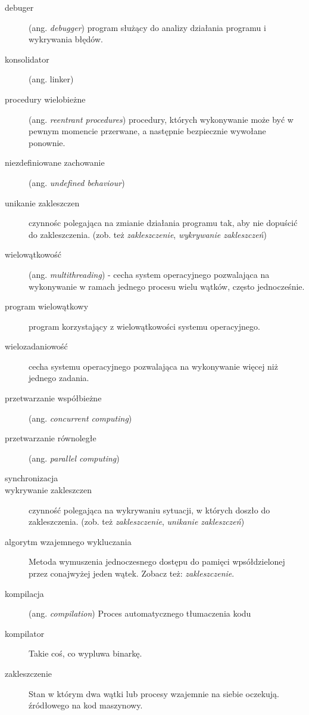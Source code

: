 \documentclass[12pt]{article}
\begin{document}
\begin{description}
	\item[debuger] (ang. \emph{debugger}) program służący do analizy działania programu i wykrywania błędów.
	\item[konsolidator] (ang. linker)
	\item[procedury wielobieżne] (ang. \emph{reentrant procedures}) procedury, których wykonywanie może być w pewnym momencie przerwane, a następnie bezpiecznie wywołane ponownie.
	\item[niezdefiniowane zachowanie] (ang. \emph{undefined behaviour})
	\item[unikanie zakleszczen] czynnośc polegająca na zmianie działania programu tak, aby nie dopuścić do zakleszczenia. (zob. też \emph{zakleszczenie}, \emph{wykrywanie zakleszczeń})
	\item[wielowątkowość] (ang. \emph{multithreading}) - cecha system operacyjnego pozwalająca na wykonywanie w ramach jednego procesu wielu wątków, często jednocześnie.
	\item[program wielowątkowy] program korzystający z wielowątkowości systemu operacyjnego.
	\item[wielozadaniowość] cecha systemu operacyjnego pozwalająca na wykonywanie więcej niż jednego zadania.
	\item[przetwarzanie współbieżne] (ang. \emph{concurrent computing})
	\item[przetwarzanie równoległe] (ang. \emph{parallel computing})
	\item[synchronizacja] 
	\item[wykrywanie zakleszczen] czynność polegająca na wykrywaniu sytuacji, w których doszło do zakleszczenia. (zob. też \emph{zakleszczenie}, \emph{unikanie zakleszczeń})
    \item[algorytm wzajemnego wykluczania] Metoda wymuszenia jednoczesnego dostępu do pamięci wpsółdzielonej przez conajwyżej jeden wątek. Zobacz też: \emph{zakleszczenie}.
    \item[kompilacja] (ang. \emph{compilation}) Proces automatycznego tłumaczenia kodu
    \item[kompilator] Takie coś, co wypluwa binarkę.
    \item[zakleszczenie] Stan w którym dwa wątki lub procesy wzajemnie na siebie oczekują.
    źródłowego na kod maszynowy.
\end{description}
\end{document}
